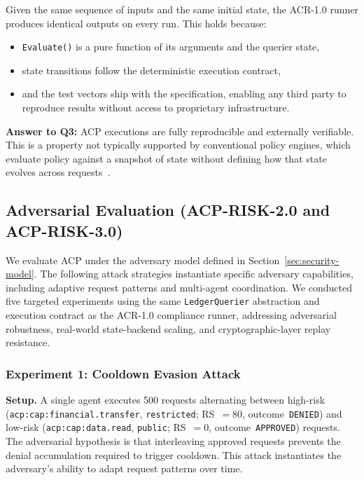 \documentclass[11pt]{article}
\theoremstyle{definition}
\begin{document}
Given the same sequence of inputs and the same initial state, the ACR-1.0 runner produces identical outputs on every run.
This holds because:

\begin{itemize}[noitemsep]
  \item \texttt{Evaluate()} is a pure function of its arguments and the querier state,
  \item state transitions follow the deterministic execution contract,
  \item and the test vectors ship with the specification, enabling any third party to reproduce results without access to proprietary infrastructure.
\end{itemize}

\noindent\textbf{Answer to Q3:}
ACP executions are fully reproducible and externally verifiable.
This is a property not typically supported by conventional policy engines, which evaluate policy against a snapshot of state without defining how that state evolves across requests~\cite{sandhu1996rbac,hu2015abac,oasis2013xacml}.

\subsection{Adversarial Evaluation (ACP-RISK-2.0 and ACP-RISK-3.0)}
\label{sec:adversarial}

We evaluate ACP under the adversary model defined in Section~\ref{sec:security-model}.
The following attack strategies instantiate specific adversary capabilities,
including adaptive request patterns and multi-agent coordination.
We conducted five targeted experiments using the same \texttt{LedgerQuerier}
abstraction and execution contract as the ACR-1.0 compliance runner,
addressing adversarial robustness, real-world state-backend scaling, and
cryptographic-layer replay resistance.

\subsubsection*{Experiment 1: Cooldown Evasion Attack}

{\sloppy
\textbf{Setup.}
A single agent executes 500 requests alternating between high-risk
(\texttt{acp:cap:financial.transfer}, \texttt{restricted}; RS~$=80$,
outcome~\texttt{DENIED}) and low-risk (\texttt{acp:cap:data.read},
\texttt{public}; RS~$=0$, outcome~\texttt{APPROVED}) requests.
The adversarial hypothesis is that interleaving approved requests prevents the
denial accumulation required to trigger cooldown.
This attack instantiates the adversary's ability to adapt request patterns over time.
\par}
\end{document}
